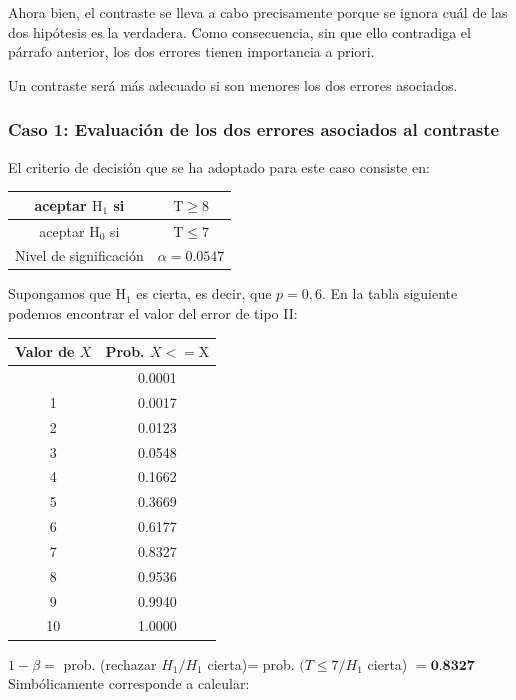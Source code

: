 \documentclass[
]{article}
\begin{document}
Ahora bien, el contraste se lleva a cabo precisamente porque se ignora cuál de las dos hipótesis es la verdadera. Como consecuencia, sin que ello contradiga el párrafo anterior, los dos errores tienen importancia a priori.

Un contraste será más adecuado si son menores los dos errores asociados.

\subsubsection{Caso 1: Evaluación de los dos errores asociados al contraste}\label{caso-1-evaluaciuxf3n-de-los-dos-errores-asociados-al-contraste}

El criterio de decisión que se ha adoptado para este caso consiste en:

\begin{longtable}[]{@{}cc@{}}
\toprule\noalign{}
aceptar \(\mathrm{H}_{1}\) si & \(\mathrm{T} \geq 8\) \\
\midrule\noalign{}
\endhead
\bottomrule\noalign{}
\endlastfoot
aceptar \(\mathrm{H}_{0}\) si & \(\mathrm{T} \leq 7\) \\
Nivel de significación & \(\alpha=0.0547\) \\
\end{longtable}

Supongamos que \(\mathrm{H}_{1}\) es cierta, es decir, que \(p=0,6\). En la tabla siguiente podemos encontrar el valor del error de tipo II:

\begin{longtable}[]{@{}cc@{}}
\toprule\noalign{}
Valor de \(X\) & Prob. \(X<=\mathrm{X}\) \\
\midrule\noalign{}
\endhead
\bottomrule\noalign{}
\endlastfoot
0 & 0.0001 \\
1 & 0.0017 \\
2 & 0.0123 \\
3 & 0.0548 \\
4 & 0.1662 \\
5 & 0.3669 \\
6 & 0.6177 \\
7 & 0.8327 \\
8 & 0.9536 \\
9 & 0.9940 \\
10 & 1.0000 \\
\end{longtable}

\(1-\beta=\) prob. (rechazar \(H_{1}/H_{1}\) cierta)= prob. \((T \leq 7/H_{1}\) cierta) \(=\mathbf{0 . 8 3 2 7}\)\\
Simbólicamente corresponde a calcular:
\end{document}
